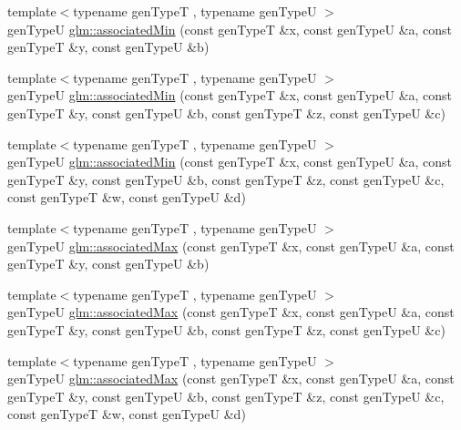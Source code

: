 \begin{DoxyCompactItemize}
\item 
{\footnotesize template$<$typename gen\+Type\+T , typename gen\+Type\+U $>$ }\\gen\+Type\+U \hyperlink{group__gtx__associated__min__max_gadcf2568cb1b0faa07db99edf47941054}{glm\+::associated\+Min} (const gen\+Type\+T \&x, const gen\+Type\+U \&a, const gen\+Type\+T \&y, const gen\+Type\+U \&b)
\item 
{\footnotesize template$<$typename gen\+Type\+T , typename gen\+Type\+U $>$ }\\gen\+Type\+U \hyperlink{group__gtx__associated__min__max_gade8e54d2002c2754f1ef07d928f1e0e9}{glm\+::associated\+Min} (const gen\+Type\+T \&x, const gen\+Type\+U \&a, const gen\+Type\+T \&y, const gen\+Type\+U \&b, const gen\+Type\+T \&z, const gen\+Type\+U \&c)
\item 
{\footnotesize template$<$typename gen\+Type\+T , typename gen\+Type\+U $>$ }\\gen\+Type\+U \hyperlink{group__gtx__associated__min__max_ga50e497a907684c60e61812001a13d569}{glm\+::associated\+Min} (const gen\+Type\+T \&x, const gen\+Type\+U \&a, const gen\+Type\+T \&y, const gen\+Type\+U \&b, const gen\+Type\+T \&z, const gen\+Type\+U \&c, const gen\+Type\+T \&w, const gen\+Type\+U \&d)
\item 
{\footnotesize template$<$typename gen\+Type\+T , typename gen\+Type\+U $>$ }\\gen\+Type\+U \hyperlink{group__gtx__associated__min__max_gaed83bceeac703a2541db6433fbf4a6d6}{glm\+::associated\+Max} (const gen\+Type\+T \&x, const gen\+Type\+U \&a, const gen\+Type\+T \&y, const gen\+Type\+U \&b)
\item 
{\footnotesize template$<$typename gen\+Type\+T , typename gen\+Type\+U $>$ }\\gen\+Type\+U \hyperlink{group__gtx__associated__min__max_gaa345b5140db56f069b6d07b4c5543531}{glm\+::associated\+Max} (const gen\+Type\+T \&x, const gen\+Type\+U \&a, const gen\+Type\+T \&y, const gen\+Type\+U \&b, const gen\+Type\+T \&z, const gen\+Type\+U \&c)
\item 
{\footnotesize template$<$typename gen\+Type\+T , typename gen\+Type\+U $>$ }\\gen\+Type\+U \hyperlink{group__gtx__associated__min__max_gaaf1a0103d1b69c400b9b10f4df067d53}{glm\+::associated\+Max} (const gen\+Type\+T \&x, const gen\+Type\+U \&a, const gen\+Type\+T \&y, const gen\+Type\+U \&b, const gen\+Type\+T \&z, const gen\+Type\+U \&c, const gen\+Type\+T \&w, const gen\+Type\+U \&d)
\end{DoxyCompactItemize}


